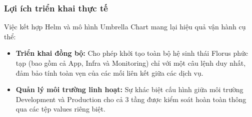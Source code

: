 \subsubsection{Lợi ích triển khai thực tế} Việc kết hợp Helm và mô hình Umbrella Chart mang lại hiệu quả vận hành cụ thể: 
\begin{itemize} 
    \item \textbf{Triển khai đồng bộ:} Cho phép khởi tạo toàn bộ hệ sinh thái Florus phức tạp (bao gồm cả App, Infra và Monitoring) chỉ với một câu lệnh duy nhất, đảm bảo tính toàn vẹn của các mối liên kết giữa các dịch vụ.
    \item \textbf{Quản lý môi trường linh hoạt:} Sự khác biệt cấu hình giữa môi trường Development và Production cho cả 3 tầng được kiểm soát hoàn toàn thông qua các tệp values riêng biệt. 
\end{itemize}